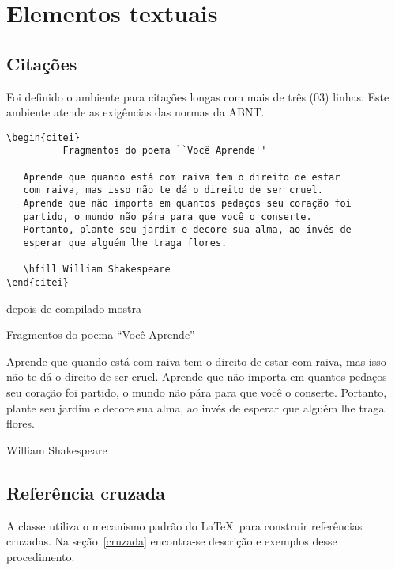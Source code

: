 
\chapter{Elementos textuais}

\section{Citações}

Foi definido o ambiente  para citações longas com
mais de três ($03$) linhas. Este ambiente atende as exigências das
normas da ABNT.

\begin{tcolorbox}
\begin{lstlisting}
\begin{citei}
          Fragmentos do poema ``Você Aprende''

   Aprende que quando está com raiva tem o direito de estar
   com raiva, mas isso não te dá o direito de ser cruel.
   Aprende que não importa em quantos pedaços seu coração foi
   partido, o mundo não pára para que você o conserte.
   Portanto, plante seu jardim e decore sua alma, ao invés de
   esperar que alguém lhe traga flores.

   \hfill William Shakespeare
\end{citei}
\end{lstlisting}
depois de compilado mostra

\begin{citei}
             Fragmentos do poema ``Você Aprende''

Aprende que quando está com raiva tem o direito de estar
com raiva, mas isso não te dá o direito de ser cruel.
Aprende que não importa em quantos pedaços seu coração foi
partido, o mundo não pára para que você o conserte.
Portanto, plante seu jardim e decore sua alma, ao invés de
esperar que alguém lhe traga flores.

\hfill William Shakespeare
\end{citei}
\end{tcolorbox}


\section{Referência cruzada}

A classe \estilo{} utiliza o mecanismo padrão do \LaTeX\ para construir referências cruzadas.
Na seção~\ref{cruzada} encontra-se descrição e exemplos desse procedimento.

